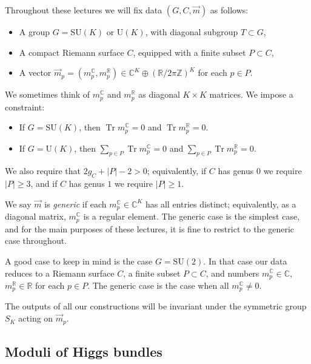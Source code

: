 \documentclass[12pt,letterpaper,reqno]{article}
\numberwithin{equation}{section}
\newcommand{\R}{\ensuremath{\mathbb R}}
\newcommand{\C}{\ensuremath{\mathbb C}}
\newcommand{\Z}{\ensuremath{\mathbb Z}}
\newcommand{\abs}[1]{\lvert#1\rvert}
\newcommand{\ti}[1]{\textit{#1}}
\DeclareMathOperator{\Tr}{Tr}
\newcommand{\SU}{\mathrm{SU}}
\newcommand{\U}{\mathrm{U}}
\newcommand{\insfig}[2]{

\medskip
\noindent
\begin{minipage}{\linewidth}

\makebox[\linewidth]{\texttt{[image: figures/\#1-crop.pdf]}}

\end{minipage}
\medskip

}
\newcommand{\fixme}[1]{{\color{orange}{[#1]}}}
\begin{document}
Throughout these lectures we will fix data $(G,C,\vec m)$ as follows:
\begin{itemize}
  \item A group $G = \SU(K)$ or $\U(K)$, with diagonal subgroup $T \subset G$,
  \item A compact Riemann surface $C$, equipped with a finite subset $P \subset C$,
  \item A vector $\vec{m}_p = (m^\C_p, m^\R_p) \in \C^K \oplus (\R / 2 \pi \Z)^K$ for each $p \in P$.
\end{itemize}
We sometimes think of $m_p^\C$ and $m_p^\R$ as diagonal
$K \times K$ matrices. We impose a constraint:
\begin{itemize}
\item If $G = \SU(K)$, then
$\Tr m_p^\C = 0$ and $\Tr m_p^\R = 0$.
\item If $G = \U(K)$, then 
$\sum_{p \in P} \Tr m_p^\C = 0$ and
$\sum_{p \in P} \Tr m_p^\R = 0$.
\end{itemize}
We also require that $2g_C + \abs{P} - 2 > 0$; equivalently, 
if $C$ has genus $0$ we require $\abs{P} \ge 3$, 
and if $C$ has genus $1$ we require $\abs{P} \ge 1$.
\insfig{higgs-metric-1}{0.8}

\begin{defn}
We say $\vec{m}$ is \ti{generic} if each $m^\C_p \in \C^K$
has all entries distinct; equivalently, as a diagonal
matrix, $m^\C_p$ is a regular element.
The generic case is the simplest
case, and for the main purposes of these lectures,
it is fine to restrict to the generic case throughout.
\end{defn}

\begin{example}[The case of $G = \SU(2)$]
A good case to keep in mind is the case $G = \SU(2)$. In that case our data reduces to a Riemann surface $C$, a finite subset $P \subset C$,
and numbers $m^\C_p \in \C$, $m^\R_p \in \R$ for each $p \in P$. The generic case is the case when all $m^\C_p \neq 0$.
\end{example}

\begin{remark} The outputs of all our constructions will 
be invariant under the symmetric group $S_K$ acting on $\vec m_p$.
\end{remark}


\subsection{Moduli of Higgs bundles}
\end{document}
